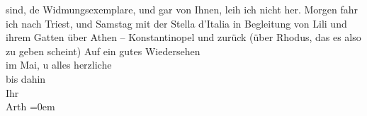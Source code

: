 \begin{ledgroupsized}[t]{13cm}
               sind, de{\geminationn} Widmungsexemplare, und gar von Ihnen, leih ich
               nicht her. \pend
           \pstart
           Morgen fahr ich nach Triest, und Samstag mit der
               Stella d’Italia in Begleitung von Lili und ihrem
                  Gatten über Athen – Konstantinopel und zurück (über Rhodus, das es also zu geben scheint) \pend
           \pstart
           Auf ein gutes Wiedersehen {\\[\baselineskip]}im Mai, u alles herzliche {\\[\baselineskip]}bis
               dahin {\\[\baselineskip]}Ihr {\\[\baselineskip]}\spacefill\mbox{Arth}\pend
           \leftskip=0em{}
         
         \endnumbering{}\end{ledgroupsized}\begin{anhang}\end{anhang}\newcommand{\dateiname}{L03024}\newcommand{\titel}{Arthur Schnitzler an Felix Salten, 11. 4. 1928}\newcommand{\editorInnen}{Martin Anton Müller und Laura Untner}
      